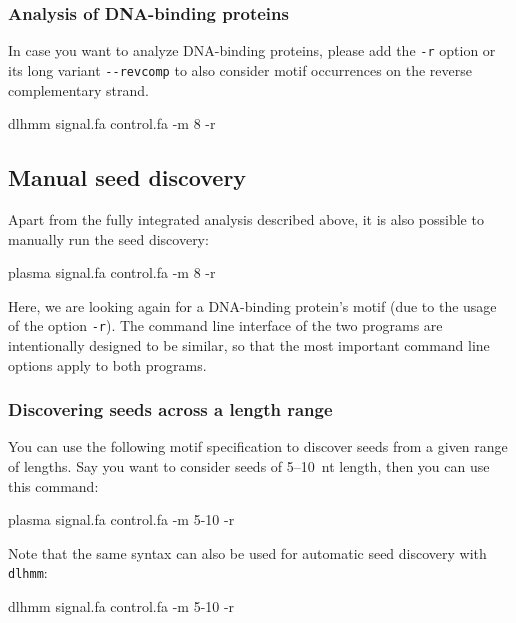 \documentclass[a4paper]{article}
\newcommand{\dlhmm}[0]{\texttt{dlhmm}}
\begin{document}
\subsubsection{Analysis of DNA-binding proteins}
In case you want to analyze DNA-binding proteins, please add the \verb|-r| option or its long variant \verb|--revcomp| to also consider motif occurrences on the reverse complementary strand.\\
\begin{verbbox}
dlhmm signal.fa control.fa -m 8 -r
\end{verbbox}
\fbox{\theverbbox[t]}

\subsection{Manual seed discovery}
\label{tutorial:plasma}
Apart from the fully integrated analysis described above, it is also possible to manually run the seed discovery:\\
\begin{verbbox}
plasma signal.fa control.fa -m 8 -r
\end{verbbox}
\fbox{\theverbbox[t]}

Here, we are looking again for a DNA-binding protein's motif (due to the usage of the option \verb|-r|).
The command line interface of the two programs are intentionally designed to be similar, so that the most important command line options apply to both programs.

\subsubsection{Discovering seeds across a length range}
You can use the following motif specification to discover seeds from a given range of lengths.
Say you want to consider seeds of 5--10~nt length, then you can use this command:\\
\begin{verbbox}
plasma signal.fa control.fa -m 5-10 -r
\end{verbbox}
\fbox{\theverbbox[t]}

Note that the same syntax can also be used for automatic seed discovery with \dlhmm{}:
\\
\begin{verbbox}
dlhmm signal.fa control.fa -m 5-10 -r
\end{verbbox}
\fbox{\theverbbox[t]}
\end{document}
